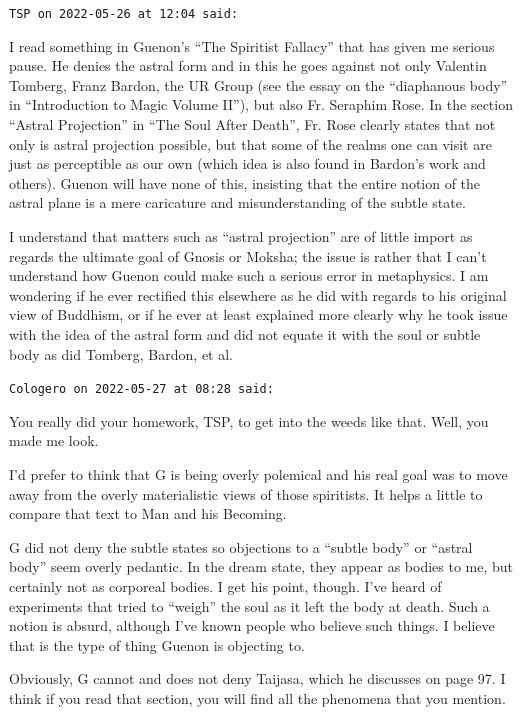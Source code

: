 \begin{footnotesize}\begin{sffamily}



\texttt{TSP on 2022-05-26 at 12:04 said: }

I read something in Guenon's “The Spiritist Fallacy” that has given me serious pause. He denies the astral form and in this he goes against not only Valentin Tomberg, Franz Bardon, the UR Group (see the essay on the “diaphanous body” in “Introduction to Magic Volume II”), but also Fr. Seraphim Rose. In the section “Astral Projection” in “The Soul After Death”, Fr. Rose clearly states that not only is astral projection possible, but that some of the realms one can visit are just as perceptible as our own (which idea is also found in Bardon's work and others). Guenon will have none of this, insisting that the entire notion of the astral plane is a mere caricature and misunderstanding of the subtle state.

I understand that matters such as “astral projection” are of little import as regards the ultimate goal of Gnosis or Moksha; the issue is rather that I can't understand how Guenon could make such a serious error in metaphysics. I am wondering if he ever rectified this elsewhere as he did with regards to his original view of Buddhism, or if he ever at least explained more clearly why he took issue with the idea of the astral form and did not equate it with the soul or subtle body as did Tomberg, Bardon, et al.


\hfill

\texttt{Cologero on 2022-05-27 at 08:28 said: }

You really did your homework, TSP, to get into the weeds like that. Well, you made me look.

I'd prefer to think that G is being overly polemical and his real goal was to move away from the overly materialistic views of those spiritists. It helps a little to compare that text to Man and his Becoming.

G did not deny the subtle states so objections to a “subtle body” or “astral body” seem overly pedantic. In the dream state, they appear as bodies to me, but certainly not as corporeal bodies. I get his point, though. I've heard of experiments that tried to “weigh” the soul as it left the body at death. Such a notion is absurd, although I've known people who believe such things. I believe that is the type of thing Guenon is objecting to.

Obviously, G cannot and does not deny Taijasa, which he discusses on page 97. I think if you read that section, you will find all the phenomena that you mention.


\end{sffamily}\end{footnotesize}
